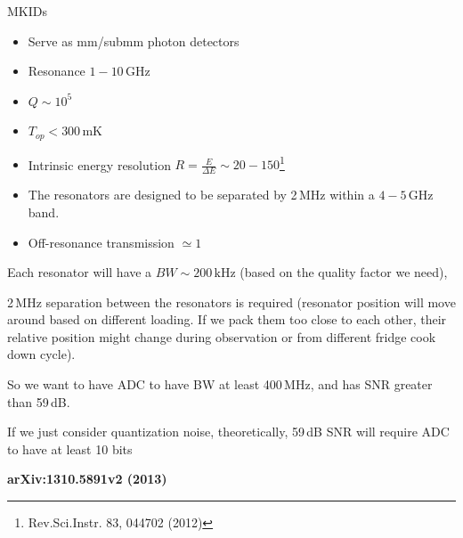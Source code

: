 \documentclass[ignorenonframetext,12pt]{beamer}
\begin{document}
\begin{frame}{MKIDs}
				\scriptsize{\begin{itemize}
								\item Serve as mm/submm photon detectors
								\item Resonance  $1-10\,\text{GHz}$ 
								\item $Q \sim 10^5$
								\item $T_{op} < 300\,\text{mK}$
								\item Intrinsic energy resolution $R = \frac{E}{\Delta E} \sim
												20-150$\footnote{Rev.Sci.Instr. 83, 044702 (2012)}
								\item The resonators are designed to be separated by 2\,MHz
												within a $4-5\,\text{GHz}$ band.
								\item Off-resonance transmission $\simeq 1$
				\end{itemize}
				Each resonator will have a $BW \sim 200\,\text{kHz}$ (\alert{based on the
				quality factor we need}),
				
				2\,MHz separation between the resonators is required (resonator position
				will move around based on different loading. If we pack them too close
				to each other, their relative position might change during observation
				or from different fridge cook down cycle). 
				
				So we want to have ADC to have BW at least 400\,MHz, and has SNR greater
				than 59\,dB. 
				
				If we just consider quantization noise, theoretically, 59\,dB SNR will
				require ADC to have at least 10 bits
				}

				\tiny{\textbf{arXiv:1310.5891v2 (2013)}}
\end{frame}
\end{document}
